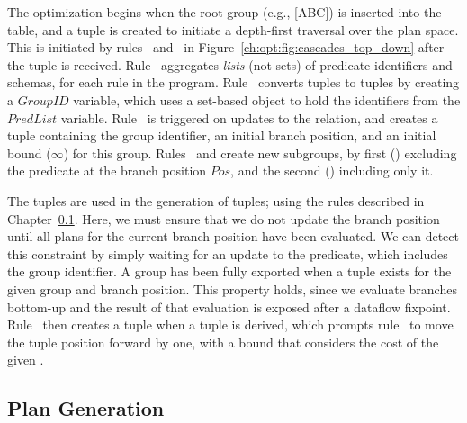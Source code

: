 The optimization begins when the root group (e.g., [ABC]) is inserted into the
 table, and a  tuple is created to initiate a depth-first
traversal over the plan space.  This is initiated by rules~
and~ in Figure~\ref{ch:opt:fig:cascades_top_down} after the
 tuple is received.  Rule~ aggregates {\em
lists} (not sets) of predicate identifiers and schemas, for each rule in the
program.  Rule~ converts  tuples to 
tuples by creating a $GroupID$ variable, which uses a set-based object to hold
the identifiers from the $PredList$ variable.  Rule~ is triggered on
updates to the  relation, and creates a  tuple
containing the group identifier, an initial branch position, and an initial
bound ($\infty$) for this group.  Rules~ and  create new
subgroups, by first () excluding the predicate at the branch position
$Pos$, and the second () including only it.

The  tuples are used in the generation of  tuples; using
the rules described in Chapter~\ref{ch:opt:sec:cascades_plan}.  Here, we must
ensure that we do not update the branch position until all plans for the
current branch position have been evaluated.  We can detect this constraint by
simply waiting for an update to the  predicate, which includes the
group identifier.  A group has been fully exported when a  tuple
exists for the given group and branch position.  This property holds, since we
evaluate branches bottom-up and the result of that evaluation is exposed after
a dataflow fixpoint.  Rule~ then creates a  tuple
when a  tuple is derived, which prompts rule~ to move the
 tuple position forward by one, with a bound that considers the cost
of the given .

\subsection{Plan Generation}
\label{ch:opt:sec:cascades_plan}


